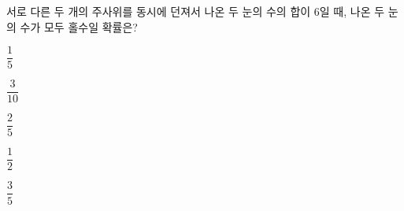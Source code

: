 서로 다른 두 개의 주사위를 동시에 던져서 나온 두 눈의 수의 합이 6일 때, 나온 두 눈의 수가 모두 홀수일 확률은?
\begin{choices32}{\rule[-3ex]{0pt}{8ex}$\dfrac{1}{5}$}{\rule[-3ex]{0pt}{8ex}$\dfrac{3}{10}$}{\rule[-3ex]{0pt}{8ex}$\dfrac{2}{5}$}{\rule[-3ex]{0pt}{8ex}$\dfrac{1}{2}$}{\rule[-3ex]{0pt}{8ex}$\dfrac{3}{5}$}\end{choices32}
